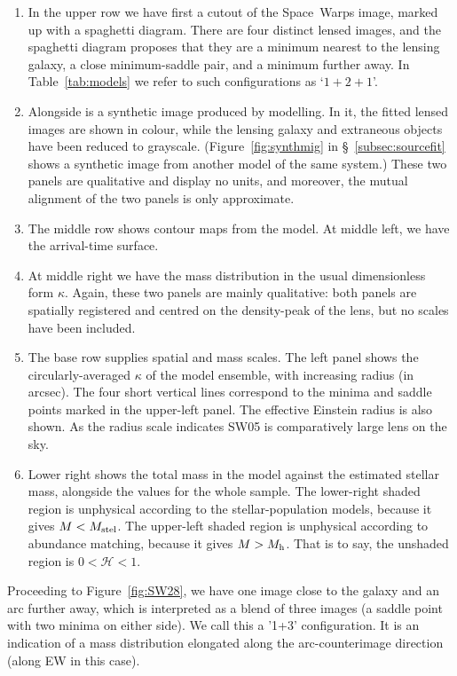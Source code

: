 \documentclass[fleqn,usenatbib]{mnras}
\newcommand{\figref}[1]{\ref{fig:#1}}
\newcommand{\Mstel}{M_{\rm stel}}
\newcommand{\Mhalo}{M_{\rm h}}
\newcommand{\haloindex}{\mathcal{H}}
\begin{document}
\begin{enumerate}
\item In the upper row we have first a cutout of the Space~Warps
  image, marked up with a spaghetti diagram.  There are four distinct
  lensed images, and the spaghetti diagram proposes that they are a
  minimum nearest to the lensing galaxy, a close minimum-saddle pair,
  and a minimum further away. In Table~\ref{tab:models} we refer to
  such configurations as `$1+2+1$'.
\item Alongside is a synthetic image produced by modelling.  In it,
  the fitted lensed images are shown in colour, while the lensing
  galaxy and extraneous objects have been reduced to grayscale.
  (Figure~\figref{synthmig} in \S~\ref{subsec:sourcefit} shows a
  synthetic image from another model of the same system.) These two
  panels are qualitative and display no units, and moreover, the
  mutual alignment of the two panels is only approximate.
\item The middle row shows contour maps from the model.  At middle
  left, we have the arrival-time surface.
\item At middle right we have the mass distribution in the usual
  dimensionless form $\kappa$.  Again, these two panels are mainly
  qualitative: both panels are spatially registered and centred on the
  density-peak of the lens, but no scales have been included.
\item The base row supplies spatial and mass scales.  The left panel
  shows the circularly-averaged $\kappa$ of the model ensemble, with
  increasing radius (in arcsec).  The four short vertical lines
  correspond to the minima and saddle points marked in the upper-left
  panel.  The effective Einstein radius is also shown.  As the radius
  scale indicates SW05 is comparatively large lens on the
  sky.
\item Lower right shows the total mass in the model against the
  estimated stellar mass, alongside the values for the whole sample.
  The lower-right shaded region is unphysical according to the
  stellar-population models, because it gives $M<\Mstel$. The
  upper-left shaded region is unphysical according to abundance
  matching, because it gives $M>\Mhalo$.  That is to say, the unshaded
  region is $0<\haloindex<1$.
\end{enumerate}

Proceeding to Figure~\figref{SW28}, we have one image close to the
galaxy and an arc further away, which is interpreted as a blend of
three images (a saddle point with two minima on either side).  We call
this a '1+3' configuration.  It is an indication of a mass
distribution elongated along the arc-counterimage direction (along EW
in this case).
\end{document}
